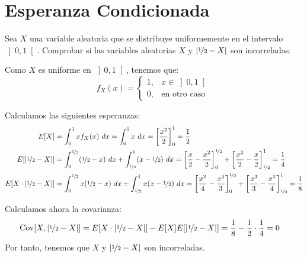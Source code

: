 \section{Esperanza Condicionada}

\begin{ejercicio}
    Sea $X$ una variable aleatoria que se distribuye uniformemente en el intervalo $\left]0,1\right[$. Comprobar si las variables aleatorias $X$ y $|\nicefrac{1}{2}-X|$ son incorreladas.

    Como $X$ es uniforme en $\left]0,1\right[$, tenemos que:
    \begin{equation*}
        f_X(x) = \begin{cases}
            1, & x\in \left]0,1\right[\\
            0, & \text{en otro caso}
        \end{cases}
    \end{equation*}

    Calculamos las siguientes esperanzas:
    \begin{align*}
        E[X] &= \int_{0}^{1} x f_X(x) \ dx = \int_{0}^{1} x \ dx = \left[\dfrac{x^2}{2}\right]_{0}^{1} = \dfrac{1}{2}\\
        E[|\nicefrac{1}{2}-X|] &= \int_{0}^{\nicefrac{1}{2}} (\nicefrac{1}{2}-x) \ dx + \int_{\nicefrac{1}{2}}^{1} (x-\nicefrac{1}{2}) \ dx
        = \left[\frac{x}{2} - \frac{x^2}{2}\right]_{0}^{\nicefrac{1}{2}} + \left[\frac{x^2}{2} - \frac{x}{2}\right]_{\nicefrac{1}{2}}^{1}
        = \frac{1}{4}\\
        E[X\cdot |\nicefrac{1}{2}-X|] &= \int_{0}^{\nicefrac{1}{2}} x(\nicefrac{1}{2}-x) \ dx + \int_{\nicefrac{1}{2}}^{1} x(x-\nicefrac{1}{2}) \ dx
        = \left[\frac{x^2}{4} - \frac{x^3}{3}\right]_{0}^{\nicefrac{1}{2}} + \left[\frac{x^3}{3}-\frac{x^2}{4}\right]_{\nicefrac{1}{2}}^{1}
        = \frac{1}{8}
    \end{align*}

    Calculamos ahora la covarianza:
    \begin{align*}
        \operatorname{Cov}[X,|\nicefrac{1}{2}-X|] &= E[X\cdot |\nicefrac{1}{2}-X|] - E[X]E[|\nicefrac{1}{2}-X|]
        = \frac{1}{8} - \frac{1}{2}\cdot \frac{1}{4}
        = 0
    \end{align*}
    Por tanto, tenemos que $X$ y $|\nicefrac{1}{2}-X|$ son incorreladas.
\end{ejercicio}

